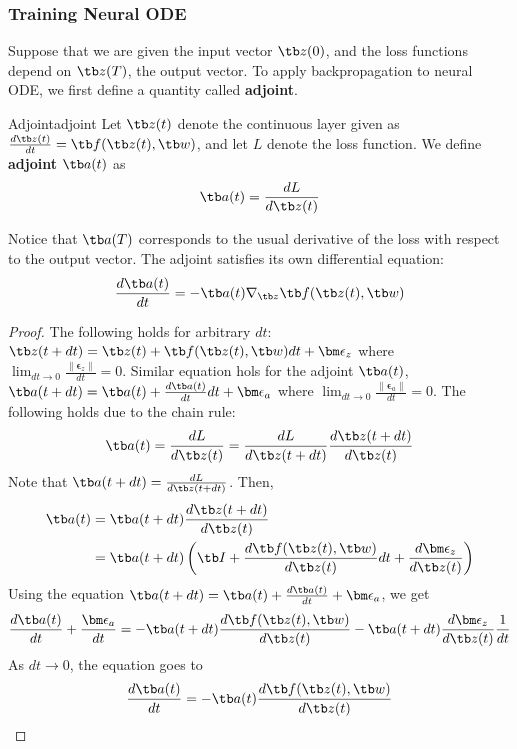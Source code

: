 \documentclass{article}
\begin{document}
        \subsubsection{Training Neural ODE}
            Suppose that we are given the input vector $\tb z(0)$, and the loss functions depend on $\tb z(T)$, the output vector.
            To apply backpropagation to neural ODE, we first define a quantity called \textbf{adjoint}.
            \begin{defn}{Adjoint}{adjoint}
                Let $\tb z(t)$ denote the continuous layer given as $\frac{d\tb z(t)}{dt}=\tb f(\tb z(t), \tb w)$,
                and let $L$ denote the loss function.
                We define \textbf{adjoint} $\tb a(t)$ as
                \[
                \tb a(t)=\frac{dL}{d\tb z(t)}
                \]
            \end{defn}
        Notice that $\tb a(T)$ corresponds to the usual derivative of the loss with respect to the output vector.
        The adjoint satisfies its own differential equation:
        \[
        \frac{d\tb a(t)}{dt}=-\tb a(t)\nabla_{\tb z}\tb f(\tb z(t), \tb w)
        \]
        \begin{proof}
            The following holds for arbitrary $dt$: $\tb z(t + dt) = \tb z(t) + \tb f(\tb z(t), \tb w)dt + \bm\epsilon_z$
            where $\lim_{dt \to 0}\frac{\|\bm\epsilon_z\|}{dt} = 0$. Similar equation hols for the adjoint $\tb a(t)$,
            $\tb a(t + dt)=\tb a(t) + \frac{d\tb a(t)}{dt}dt + \bm\epsilon_a$ where $\lim_{dt \to 0}\frac{\|\bm\epsilon_a\|}{dt} = 0$.
            The following holds due to the chain rule:
            \[
            \tb a(t) = \frac{dL}{d\tb z(t)} = \frac{dL}{d\tb z(t + dt)}\frac{d\tb z(t + dt)}{d\tb z(t)}
            \]
            Note that $\tb a(t + dt) = \frac{dL}{d\tb z(t+dt)}$. Then,
            \begin{align*}
                \tb a(t) &= \tb a(t + dt)\frac{d\tb z(t + dt)}{d\tb z(t)} \\
                &= \tb a(t + dt)\left( \tb I + \frac{d\tb f(\tb z(t), \tb w)}{d\tb z(t)}dt + \frac{d\bm\epsilon_z}{d\tb z(t)} \right)
            \end{align*}
            Using the equation $\tb a(t + dt)=\tb a(t) + \frac{d\tb a(t)}{dt} + \bm\epsilon_a$,
            we get
            \begin{align*}
                \frac{d\tb a(t)}{dt} + \frac{\bm\epsilon_a}{dt} =
                -\tb a(t + dt)\frac{d\tb f(\tb z(t),\tb w)}{d\tb z(t)}
                - \tb a(t+dt)\frac{d\bm\epsilon_z}{d\tb z(t)}\frac{1}{dt}
            \end{align*}
            As $dt \to 0$, the equation goes to
            \[
                \frac{d\tb a(t)}{dt} = -\tb a(t)\frac{d\tb f(\tb z(t),\tb w)}{d\tb z(t)}
            \]
        \end{proof}
\end{document}
